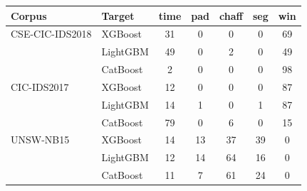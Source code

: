 \begin{tabular}{@{}llccccc@{}}
\toprule
\textbf{Corpus} & \textbf{Target} & \textbf{time} & \textbf{pad} & \textbf{chaff} & \textbf{seg} & \textbf{win} \\
\midrule
CSE-CIC-IDS2018 & XGBoost & 31 & 0 & 0 & 0 & 69 \\
 & LightGBM & 49 & 0 & 2 & 0 & 49 \\
 & CatBoost & 2 & 0 & 0 & 0 & 98 \\
\midrule
CIC-IDS2017 & XGBoost & 12 & 0 & 0 & 0 & 87 \\
 & LightGBM & 14 & 1 & 0 & 1 & 87 \\
 & CatBoost & 79 & 0 & 6 & 0 & 15 \\
\midrule
UNSW-NB15 & XGBoost & 14 & 13 & 37 & 39 & 0 \\
 & LightGBM & 12 & 14 & 64 & 16 & 0 \\
 & CatBoost & 11 & 7 & 61 & 24 & 0 \\
\bottomrule
\end{tabular}
